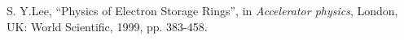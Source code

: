 \documentclass[a4paper,
               keeplastbox,   %
               ]{jacow}
\begin{document}
\begin{thebibliography}{14}
        S. Y.Lee,
        \textquotedblleft{Physics of Electron Storage Rings}\textquotedblright,
        in \emph{Accelerator physics}, London, UK: World Scientific, 1999, pp. 383-458.


           


        
 
       

 
    

    

    
   
	\end{thebibliography}
\end{document}
